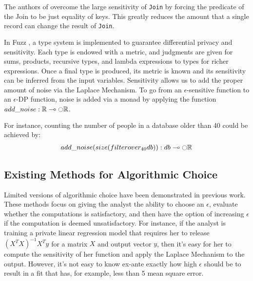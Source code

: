 \documentclass[11pt]{article}
\begin{document}
The authors of \cite{Johnson:2017} overcome the large sensitivity of \texttt{Join} by forcing the predicate of the Join to be just equality of keys. This greatly reduces the amount that a single record can change the result of \texttt{Join}.

In Fuzz \cite{Reed:2010}, a type system is implemented to guarantee differential privacy and sensitivity. Each type is endowed with a metric, and judgments are given for sums, products, recursive types, and lambda expressions to types for richer expressions. Once a final type is produced, its metric is known and its sensitivity can be inferred from the input variables. Sensitivity allows us to add the proper amount of noise via the Laplace Mechanism. To go from an $\epsilon$-sensitive function to an $\epsilon$-DP function, noise is added via a monad by applying the function $add\_noise : \mathbb{R} \multimap \fullmoon\mathbb{R}$.

For instance, counting the number of people in a database older than 40 could be achieved by:
\[
add\_noise (size (filter over_{40} db)) : db \multimap \fullmoon\mathbb{R}
\]

\subsection{Existing Methods for Algorithmic Choice}

Limited versions of algorithmic choice have been demonstrated in previous work. These methods focus on giving the analyst the ability to choose an $\epsilon$, evaluate whether the computations is satisfactory, and then have the option of increasing $\epsilon$ if the computation is deemed unsatisfactory.
For instance, if the analyst is training a private linear regression model that requires her to release $(X^TX)^{-1}X^Ty$ for a matrix $X$ and output vector $y$, then it's easy for her to compute the sensitivity of her function and apply the Laplace Mechanism to the output. However, it's not easy to know ex-ante exactly how high $\epsilon$ should be to result in a fit that has, for example, less than 5 mean square error.
\end{document}
